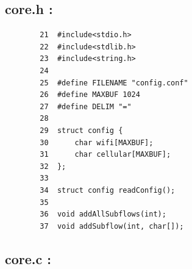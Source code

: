 \documentclass[a4paper,11pt]{article}
\begin{document}
	 	\subsection{core.h :}
	 	\label{subsec:core.h}
	 	\begin{lstlisting}
		21 	#include<stdio.h>
		22	#include<stdlib.h>
		23	#include<string.h>
		24
		25	#define FILENAME "config.conf"
		26	#define MAXBUF 1024
		27	#define DELIM "="
		28
		29	struct config {
		30		char wifi[MAXBUF];
		31		char cellular[MAXBUF];
		32	};
		33
		34	struct config readConfig();
		35
		36	void addAllSubflows(int);
		37	void addSubflow(int, char[]);
		\end{lstlisting}

		\subsection{core.c :}
	 	\label{subsec:core.c}
\end{document}
